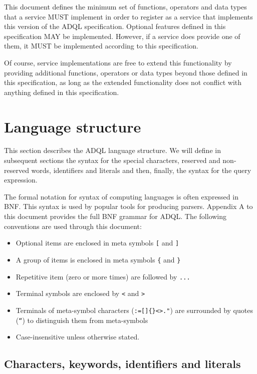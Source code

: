 \documentclass[11pt,a4paper]{ivoa}
\begin{document}
This document defines the minimum set of functions, operators and data types
that a service MUST implement in order to register as a service that
implements this version of the ADQL specification. Optional features defined in
this specification MAY be implemented. However, if a service does provide one of
them, it MUST be implemented according to this specification.

Of course, service implementations are free to extend this functionality by
providing additional functions, operators or data types beyond those defined in
this specification, as long as the extended functionality does not conflict
with anything defined in this specification.

\clearpage %
\section{Language structure}
\label{sec:language}

This section describes the ADQL language structure. We will define in
subsequent sections the syntax for the special characters, reserved and non-
reserved words, identifiers and literals and then, finally, the syntax for
the query expression.

The formal notation for syntax of computing languages is often expressed
in BNF. This syntax is used by popular tools for
producing parsers. Appendix A to this document provides the full BNF grammar
for ADQL. The following conventions are used through this document:

\begin{itemize}
    \item Optional items are enclosed in meta symbols \verb:[: and \verb:]:
    \item A group of items is enclosed in meta symbols \verb:{: and \verb:}:
    \item Repetitive item (zero or more times) are followed by \verb:...:
    \item Terminal symbols are enclosed by \verb:<: and \verb:>:
    \item Terminals of meta-symbol characters (\verb!:=[]{}<>."!) are surrounded by quotes (\verb:“:) to distinguish them from meta-symbols
    \item Case-insensitive unless otherwise stated.
\end{itemize}


\subsection{Characters, keywords, identifiers and literals}
\end{document}
